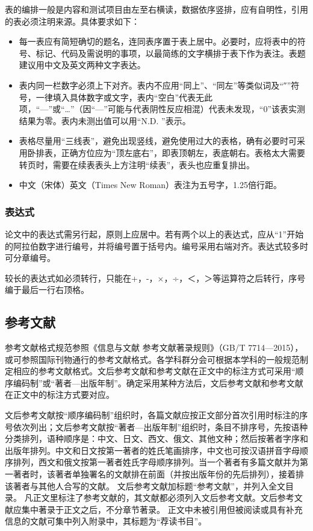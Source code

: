 表的编排一般是内容和测试项目由左至右横读，数据依序竖排，应有自明性，引用的表必须注明来源。具体要求如下：
\begin{itemize}
    \item 每一表应有简短确切的题名，连同表序置于表上居中。必要时，应将表中的符号、标记、代码及需说明的事项，以最简练的文字横排于表下作为表注。表题建议用中文及英文两种文字表达。
    \item 表内同一栏数字必须上下对齐。表内不应用“同上”、“同左”等类似词及“″”符号，一律填入具体数字或文字，表内“空白”代表无此项，“—”或“…”（因“—”可能与代表阴性反应相混）代表未发现，“0”该表实测结果为零。表内未测出值可以用“N.D. ”表示。
    \item 表格尽量用“三线表”，避免出现竖线，避免使用过大的表格，确有必要时可采用卧排表，正确方位应为“顶左底右”，即表顶朝左，表底朝右。表格太大需要转页时，需要在续表表头上方注明“续表”，表头也应重复排出。
    \item 中文（宋体）英文（Times New Roman）表注为五号字，1.25倍行距。
\end{itemize}

\subsubsection{表达式}
论文中的表达式需另行起，原则上应居中。若有两个以上的表达式，应从“1”开始的阿拉伯数字进行编号，并将编号置于括号内。编号采用右端对齐。表达式较多时可分章编号。

较长的表达式如必须转行，只能在+，-，×，÷，＜，＞等运算符之后转行，序号编于最后一行右顶格。

\subsection{参考文献}
参考文献格式规范参照《信息与文献 参考文献著录规则》（GB/T 7714—2015），或可参照国际刊物通行的参考文献格式。各学科群分会可根据本学科的一般规范制定相应的参考文献格式。文后参考文献和参考文献在正文中的标注方式可采用“顺序编码制”或“著者—出版年制”。确定采用某种方法后，文后参考文献和参考文献在正文中的标注方式要对应。

文后参考文献按“顺序编码制”组织时，各篇文献应按正文部分首次引用时标注的序号依次列出；文后参考文献按“著者—出版年制”组织时，条目不排序号，先按语种分类排列，语种顺序是：中文、日文、西文、俄文、其他文种；然后按著者字序和出版年排列。中文和日文按第一著者的姓氏笔画排序，中文也可按汉语拼音字母顺序排列，西文和俄文按第一著者姓氏字母顺序排列。当一个著者有多篇文献并为第一著者时，该著者单独署名的文献排在前面（并按出版年份的先后排列），接着排该著者与其他人合写的文献。
文后参考文献加标题“参考文献”，并列入全文目录。
凡正文里标注了参考文献的，其文献都必须列入文后参考文献。文后参考文献应集中著录于正文之后，不分章节著录。
正文中未被引用但被阅读或具有补充信息的文献可集中列入附录中，其标题为“荐读书目”。

